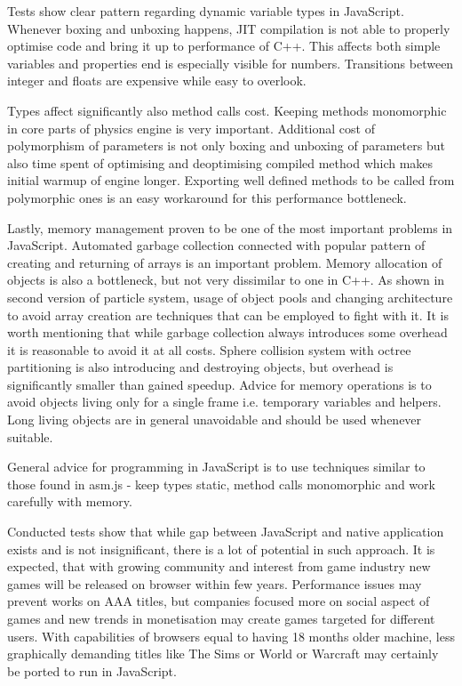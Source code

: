 Tests show clear pattern regarding dynamic variable types in JavaScript. Whenever boxing and unboxing happens, JIT compilation is not able to properly optimise code and bring it up to performance of C++. This affects both simple variables and properties end is especially visible for numbers. Transitions between integer and floats are expensive while easy to overlook.

Types affect significantly also method calls cost. Keeping methods monomorphic in core parts of physics engine is very important. Additional cost of polymorphism of parameters is not only boxing and unboxing of parameters but also time spent of optimising and deoptimising compiled method which makes initial warmup of engine longer. Exporting well defined methods to be called from polymorphic ones is an easy workaround for this performance bottleneck.

Lastly, memory management proven to be one of the most important problems in JavaScript. Automated garbage collection connected with popular pattern of creating and returning of arrays is an important problem. Memory allocation of objects is also a bottleneck, but not very dissimilar to one in C++. As shown in second version of particle system, usage of object pools and changing architecture to avoid array creation are techniques that can be employed to fight with it. It is worth mentioning that while garbage collection always introduces some overhead it is reasonable to avoid it at all costs. Sphere collision system with octree partitioning is also introducing and destroying objects, but overhead is significantly smaller than gained speedup. Advice for memory operations is to avoid objects living only for a single frame i.e. temporary variables and helpers. Long living objects are in general unavoidable and should be used whenever suitable.

General advice for programming in JavaScript is to use techniques similar to those found in asm.js - keep types static, method calls monomorphic and work carefully with memory.

Conducted tests show that while gap between JavaScript and native application exists and is not insignificant, there is a lot of potential in such approach. It is expected, that with growing community and interest from game industry new games will be released on browser within few years. Performance issues may prevent works on AAA titles, but companies focused more on social aspect of games and new trends in monetisation may create games targeted for different users. With capabilities of browsers equal to having 18 months older machine, less graphically demanding titles like The Sims or World or Warcraft may certainly be ported to run in JavaScript.

